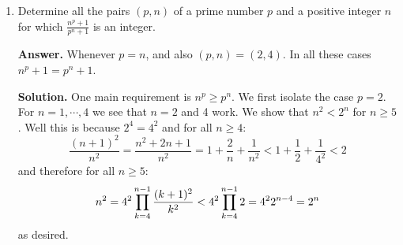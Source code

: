 \documentclass[11pt,a4paper]{article}
\begin{document}
\begin{enumerate}
	\textbf{Answer.} It's 5. 
	
	\textbf{Solution.} I will construct the example for 5 later as I need to brush up this part of my \LaTeX . 
	
	To show that 5 is the upper bound, consider sliding the vertical line from left to right. The left has sum increasing and right has sum decreasing in this process. By the problem condition, at one point (say when the line is at $k$ with $1\le k\le 2012$) the left part has sum $\le 1$ but after a slide to the right the right part has sum $\le 1$. This means: 
	\begin{itemize}
		\item The sum of columns $1, 2, \cdots , k$ is $\le 1$
		\item The sum of columns $k+2, \cdots , n=2012$ is $\le 1$
	\end{itemize}
	We could have let $k=0$ or 2012, but this will make the sum of the whole grid $\le 1$ which is no longer fun. 
	
	Similarly, there's an $m$ such that the sum of rows $1, \cdots , m$ is $\le 1$ and sum of rows $m+2, \cdots , 2012$ is $\le 1$. Thus, the sum of parts of grids that have columns $\le k$, $\ge k+2$, or rows $\le m$ or $\ge m+2$ is at most 4(some part of the grid is counted $>1$ times but that's okay for this upper bound since all numebers are nonnegative). The only part not covered is $(k+1, m+1)$ which has sum $\le 1$, hence 5 is an upper bound. 
	
	\item Determine all the pairs $ (p , n )$ of a prime number $ p$ and a positive integer $ n$ for which $ \frac{ n^p + 1 }{p^n + 1} $ is an integer.
	
	\textbf{Answer.} Whenever $p=n$, and also $(p, n)=(2, 4)$. In all these cases $n^p+1=p^n+1$. 
	
	\textbf{Solution.} 
	One main requirement is $n^p\ge p^n$. 
	We first isolate the case $p=2$. For $n=1, \cdots , 4$ we see that $n=2$ and 4 work. We show that $n^2<2^n$ for $n\ge 5$. Well this is because $2^4=4^2$ and for all $n\ge 4$: 
	\[
	\frac{(n+1)^2}{n^2}=\frac{n^2+2n+1}{n^2}=1+\frac{2}{n}+\frac{1}{n^2}<1+\frac 12 + \frac{1}{4^2}<2
	\]
	and therefore for all $n\ge 5$: 
	\[
	n^2 = 4^2\displaystyle\prod_{k=4}^{n-1}\frac{(k+1)^2}{k^2} < 4^2\displaystyle\prod_{k=4}^{n-1} 2 = 4^2 2^{n-4}=2^n
	\]
	as desired. 
	

\end{enumerate}
\end{document}

